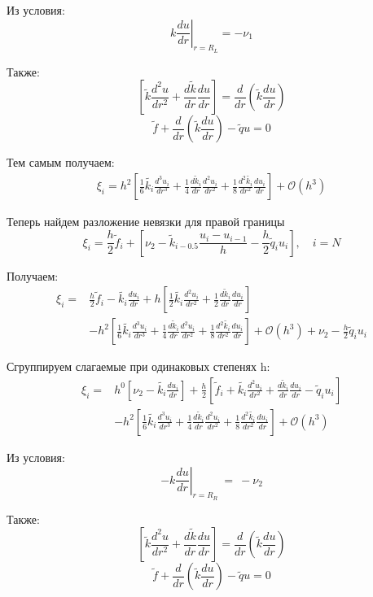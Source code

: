 Из условия:
\[
  k \left. \frac{du}{dr}\right\vert_{r = R_L} = -\nu _1
\]

Также:
\[
  \left [ \tilde{k} \frac{d^2u}{dr^2} + \frac{d\tilde{k}}{dr}\frac{du}{dr} \right ] =
  \frac{d}{dr}\left ( \tilde{k} \frac{du}{dr} \right )
\]
\[
  \tilde{f} + \frac{d}{dr}\left ( \tilde{k} \frac{du}{dr} \right ) - \tilde{q}u = 0
\]

Тем самым получаем:
\begin{align*}
  \xi_i = h^2 \left [ \frac{1}{6}\tilde{k_i} \frac{d^3 u_i}{d r^3} + \frac{1}{4}\frac{d \tilde{k}_i}{dr} \frac{d^2 u_i}{d r^2} + \frac{1}{8}\frac{d^2 \tilde{k_i}}{dr^2} \frac{d u_i}{d r} \right ] + \mathcal{O}(h^3)
\end{align*}

Теперь найдем разложение невязки для правой границы
\[
  \xi_i = \frac{h}{2} \tilde{f}_i + \left [ \nu_2 - \tilde{k}_{i-0.5}\frac{u_{i} - u_{i-1}}{h} - \frac{h}{2} \tilde{q}_i u_i \right ], \quad i = N
\]

Получаем:
\begin{align*}
  \xi_i = &\frac{h}{2} \tilde{f}_i - \tilde{k_i} \frac{du_i}{dr} + h \left [ \frac{1}{2}\tilde{k_i} \frac{d^2 u_i}{d r^2} + \frac{1}{2}\frac{d \tilde{k}_i}{dr} \frac{d u_i}{d r} \right ] \\
  &- h^2 \left [ \frac{1}{6}\tilde{k_i} \frac{d^3 u_i}{d r^3} + \frac{1}{4}\frac{d \tilde{k}_i}{dr} \frac{d^2 u_i}{d r^2} + \frac{1}{8}\frac{d^2 \tilde{k_i}}{dr^2} \frac{d u_i}{d r} \right ]
  + \mathcal{O}(h^3) + \nu_2 - \frac{h}{2} \tilde{q}_i u_i
\end{align*}

Сгруппируем слагаемые при одинаковых степенях h:
\begin{align*}
  \xi_i = &h^0 \left[ \nu_2 - \tilde{k_i} \frac{du_i}{dr} \right] + \frac{h}{2} \left[ \tilde{f}_i + \tilde{k_i} \frac{d^2 u_i}{d r^2} + \frac{d \tilde{k}_i}{dr} \frac{d u_i}{d r} - \tilde{q}_i u_i\right] \\
  &- h^2 \left [ \frac{1}{6}\tilde{k_i} \frac{d^3 u_i}{d r^3} + \frac{1}{4}\frac{d \tilde{k}_i}{dr} \frac{d^2 u_i}{d r^2} + \frac{1}{8}\frac{d^2 \tilde{k_i}}{dr^2} \frac{d u_i}{d r} \right ] + \mathcal{O}(h^3)
\end{align*}

Из условия:
\[
  -k \left. \frac{du}{dr}\right\vert_{r = R_R}\ =\ -\nu_2
\]

Также:
\[
  \left [ \tilde{k} \frac{d^2u}{dr^2} + \frac{d\tilde{k}}{dr}\frac{du}{dr} \right ] =
  \frac{d}{dr}\left ( \tilde{k} \frac{du}{dr} \right )
\]
\[
  \tilde{f} + \frac{d}{dr}\left ( \tilde{k} \frac{du}{dr} \right ) - \tilde{q}u = 0
\]

